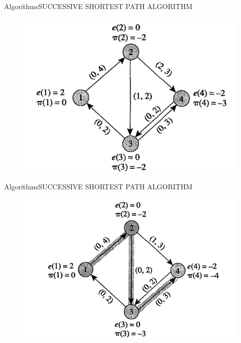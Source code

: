 \documentclass{beamer}
\begin{document}
\begin{frame}{Algorithms}{SUCCESSIVE SHORTEST PATH ALGORITHM}
\begin{figure}[h!t]
\centering
\includegraphics[scale = 0.5 ]{figura3succesive.png}
\end{figure}
\end{frame}

\begin{frame}{Algorithms}{SUCCESSIVE SHORTEST PATH ALGORITHM}
\begin{figure}[h!t]
\centering
\includegraphics[scale = 0.5 ]{figura4succesive.png}
\end{figure}
\end{frame}
\end{document}
